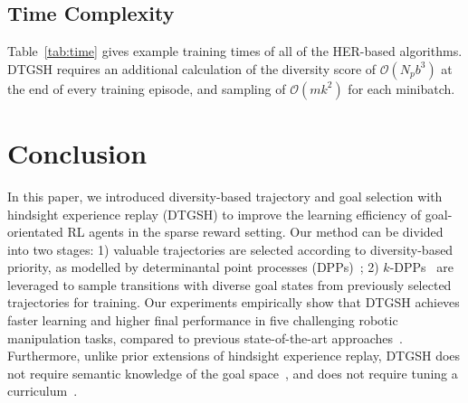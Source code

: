 \subsection{Time Complexity}
Table~\ref{tab:time} gives example training times of all of the HER-based algorithms. DTGSH requires an additional calculation of the diversity score of $\mathcal{O}(N_{p}b^3)$ at the end of every training episode, and sampling of $\mathcal{O}(mk^2)$ for each minibatch.
\begin{table}[h]
    \centering
    \vspace{0.2em}
    \caption{Training time (hours:minutes:seconds) of DTGSH and baseline approaches on the Push task for 50 epochs.}
    \label{tab:time}
\end{table}

\section{Conclusion}
In this paper, we introduced diversity-based trajectory and goal selection with hindsight experience replay (DTGSH) to improve the learning efficiency of goal-orientated RL agents in the sparse reward setting. Our method can be divided into two stages: 1) valuable trajectories are selected according to diversity-based priority, as modelled by determinantal point processes (DPPs)~\cite{kulesza2012determinantal}; 2) $k$-DPPs~\cite{kulesza2011k} are leveraged to sample transitions with diverse goal states from previously selected trajectories for training. Our experiments empirically show that DTGSH achieves faster learning and higher final performance in five challenging robotic manipulation tasks, compared to previous state-of-the-art approaches~\cite{NIPS2017_453fadbd,fang2019curriculum,zhao2018energy}. Furthermore, unlike prior extensions of hindsight experience replay, DTGSH does not require semantic knowledge of the goal space~\cite{zhao2018energy}, and does not require tuning a curriculum~\cite{fang2019curriculum}.